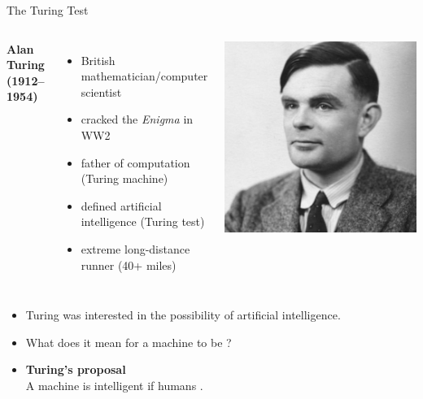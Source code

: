 \documentclass[xcolor={usenames,svgnames,x11names,dvipsnames,table}]{beamer}
\begin{document}
\begin{frame}{The Turing Test}
    \begin{columns}
            \textbf{Alan Turing (1912--1954)}
            \begin{itemize}
                \item British mathematician\slash computer scientist
                \item cracked the \emph{Enigma} in WW2
                \item father of computation (Turing machine)
                \item defined artificial intelligence (Turing test)
                \item extreme long-distance runner (40+ miles)
            \end{itemize}
        \includegraphics[width=1\linewidth]{./img/turing}
    \end{columns}

    \pause
    \medskip
    \begin{itemize}
        \item Turing was interested in the possibility of artificial intelligence.
        \item What does it mean for a machine to be ?
        \item \textbf{Turing's proposal}\\
            A machine is intelligent if humans .
    \end{itemize}
\end{frame}
\end{document}
